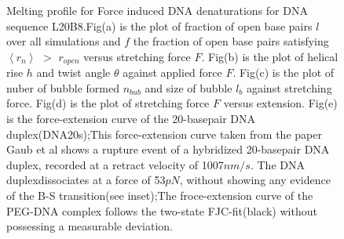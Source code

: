\documentclass[12pt,masters,final]{UTRGVthesis}
\begin{document}
\begin{figure}[!h]
\caption{\small Melting profile for Force induced DNA denaturations for DNA sequence L20B8.Fig(a) is the plot of fraction of open base pairs $l$ over all simulations and $f$ the fraction of open base pairs satisfying $\left<r_n\right>$ $>$ $r_{open}$ versus stretching force $F$. Fig(b) is the plot of helical rise $h$ and twist angle $\theta$ against applied force $F$. Fig(c) is the plot of nuber of bubble formed  $n_{bub}$ and size of bubble $l_b$ against stretching force. Fig(d) is the plot of stretching force $F$ versus extension. Fig(e) is the force-extension curve of the 20-basepair DNA duplex(DNA20s);This force-extension curve taken from the paper Gaub et al shows a rupture event of a hybridized 20-basepair DNA duplex, recorded at a retract velocity of 1007$nm/s$. The DNA duplexdissociates at a force of 53$pN$, without showing any evidence of the B-S transition(see inset);The froce-extension curve of the  PEG-DNA complex follows the two-state FJC-fit(black) without possessing a measurable deviation.}
\label{fig:L20b8}    

\end{figure}
%
\newpage
\end{document}
